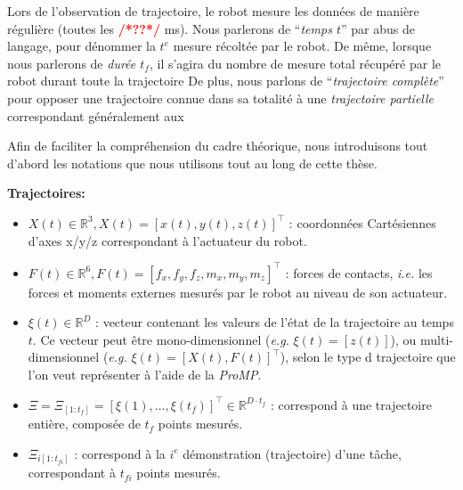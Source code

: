 \documentclass[utf8]{frontiersSCNS} %
\newcommand{\todo}[1]{\textcolor{red}{\textbf{/*#1*/}}}
\begin{document}
Lors de l'observation de trajectoire, le robot mesure les données de manière régulière (toutes les \todo{??} ms). Nous parlerons de ``\textit{temps $t$}'' par abus de langage, pour dénommer la $t^e$ mesure récoltée par le robot. De même, lorsque nous parlerons de \textit{durée $t_f$}, il s'agira du nombre de mesure total récupéré par le robot durant toute la trajectoire
De plus, nous parlons de ``\textit{trajectoire complète}'' pour opposer une trajectoire connue dans sa totalité à une \textit{trajectoire partielle} correspondant généralement aux  


Afin de faciliter la compréhension du cadre théorique, nous introduisons tout d'abord les notations que nous utilisons tout au long de cette thèse.

\noindent
\textbf{Trajectoires:}
\begin{itemize}
\item $X(t)\in \mathbb{R}^3, X(t) = [x(t), y(t), z(t)]^\top$ : coordonnées Cartésiennes d'axes x/y/z correspondant à l'actuateur du robot.
\item $F(t) \in \mathbb{R}^6, F(t) = [f_x, f_y, f_z, m_x, m_y, m_z]^\top$ : forces de contacts, \textit{i.e.} les forces et moments externes mesurés par le robot au niveau de son actuateur.
\item $\xi(t) \in \mathbb{R}^D$ : vecteur contenant les valeurs de l'état de la trajectoire au temps $t$. Ce vecteur peut être mono-dimensionnel (\textit{e.g.} $\xi(t) = [z(t)]$), ou multi-dimensionnel (\textit{e.g.} $\xi(t) = [X(t), F(t)]^\top$), selon le type d trajectoire que l'on veut représenter à l'aide de la \textit{ProMP}.

\item $\Xi = \Xi_{[1:t_{f}]} = [\xi(1), \ldots, \xi(t_{f})]^\top \in \mathbb{R}^{D \cdot t_{f}}$ : correspond à une trajectoire entière, composée de $t_f$ points mesurés.

\item $\Xi_{i[1:t_{fi}]}$ : correspond à la $i^{e}$ démonstration (trajectoire) d'une tâche, correspondant à $t_{fi}$ points mesurés.


\end{itemize}
\end{document}
